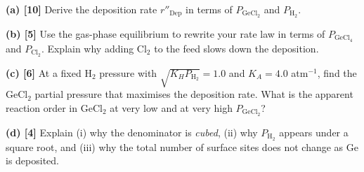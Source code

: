 \documentclass[11pt]{article}
\newcommand{\workspace}[1]{\par\vspace{#1}}
\begin{document}
\textbf{(a) [10]} Derive the deposition rate $r''_{\text{Dep}}$ in terms of $P_{\mathrm{GeCl_2}}$ and $P_{\mathrm{H_2}}$.
\workspace{8.5cm}

\textbf{(b) [5]} Use the gas-phase equilibrium to rewrite your rate law in terms of $P_{\mathrm{GeCl_4}}$ and $P_{\mathrm{Cl_2}}$.
Explain why adding Cl$_2$ to the feed slows down the deposition.
\workspace{5cm}

\newpage
\textbf{(c) [6]} At a fixed H$_2$ pressure with $\sqrt{K_HP_{\mathrm{H_2}}}=1.0$ and $K_A=4.0$ atm$^{-1}$, find the GeCl$_2$
partial pressure that maximises the deposition rate. What is the apparent reaction order in GeCl$_2$ at very low and at
very high $P_{\mathrm{GeCl_2}}$?
\workspace{7cm}

\textbf{(d) [4]} Explain (i) why the denominator is \emph{cubed}, (ii) why $P_{\mathrm{H_2}}$ appears under a square root,
and (iii) why the total number of surface sites does not change as Ge is deposited.
\workspace{6cm}

\newpage
\end{document}

